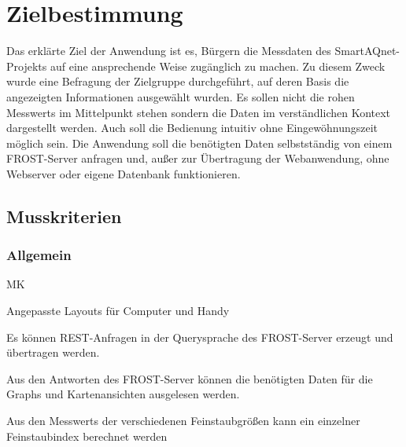 \section{Zielbestimmung}
Das erklärte Ziel der Anwendung ist es, Bürgern die Messdaten des \gls{SmartAQnet}-Projekts auf eine ansprechende Weise zugänglich zu machen.
Zu diesem Zweck wurde eine Befragung der Zielgruppe durchgeführt, auf deren Basis die angezeigten Informationen ausgewählt wurden.
Es sollen nicht die rohen \glspl{Messwert} im Mittelpunkt stehen sondern die Daten im verständlichen Kontext dargestellt werden.
Auch soll die Bedienung intuitiv ohne Eingewöhnungszeit möglich sein.
Die Anwendung soll die benötigten Daten selbstständig von einem \gls{FROST-Server} anfragen und, außer zur Übertragung der \gls{Webanwendung}, ohne \gls{Webserver} oder eigene Datenbank funktionieren.

\subsection{Musskriterien}
\setcounter{counter}{10}

\subsubsection*{Allgemein}
\begin{Kriterien}{MK}

	\item Angepasste Layouts für Computer und \gls{Handy}
	
	\item Es können REST-Anfragen in der \gls{Querysprache} des \gls{FROST-Server} erzeugt und übertragen werden.
	
	\item Aus den Antworten des \gls{FROST-Server} können die benötigten Daten für die \glspl{Graph} und Kartenansichten ausgelesen werden.
	
	\item Aus den \glspl{Messwert} der verschiedenen Feinstaubgrößen kann ein einzelner \gls{Feinstaubindex} berechnet werden
\end{Kriterien}

